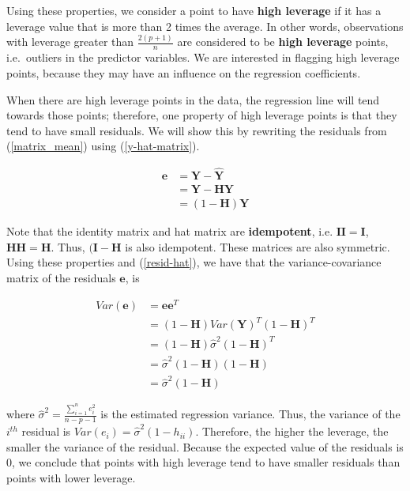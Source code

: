 \documentclass[]{book}
\begin{document}
Using these properties, we consider a point to have \textbf{high
leverage} if it has a leverage value that is more than 2 times the
average. In other words, observations with leverage greater than
\(\frac{2(p+1)}{n}\) are considered to be \textbf{high leverage} points,
i.e.~outliers in the predictor variables. We are interested in flagging
high leverage points, because they may have an influence on the
regression coefficients.

When there are high leverage points in the data, the regression line
will tend towards those points; therefore, one property of high leverage
points is that they tend to have small residuals. We will show this by
rewriting the residuals from (\ref{matrix_mean}) using
(\ref{y-hat-matrix}).

\begin{equation}
\label{resid-hat}
\begin{aligned}
\mathbf{e} &= \mathbf{Y} - \hat{\mathbf{Y}} \\[10pt]
& = \mathbf{Y} - \mathbf{H}\mathbf{Y} \\[10pt]
&= (1-\mathbf{H})\mathbf{Y}
\end{aligned}
\end{equation}

Note that the identity matrix and hat matrix are \textbf{idempotent},
i.e. \(\mathbf{I}\mathbf{I} = \mathbf{I}\),
\(\mathbf{H}\mathbf{H} = \mathbf{H}\). Thus,
\((\mathbf{I} - \mathbf{H}\) is also idempotent. These matrices are also
symmetric. Using these properties and (\ref{resid-hat}), we have that
the variance-covariance matrix of the residuals \(\boldsymbol{e}\), is

\begin{equation}
\label{resid-var}
\begin{aligned}
Var(\mathbf{e}) &= \mathbf{e}\mathbf{e}^T \\[10pt]
&=  (1-\mathbf{H})Var(\mathbf{Y})^T(1-\mathbf{H})^T \\[10pt]
&= (1-\mathbf{H})\hat{\sigma}^2(1-\mathbf{H})^T  \\[10pt]
&= \hat{\sigma}^2(1-\mathbf{H})(1-\mathbf{H})  \\[10pt]
&= \hat{\sigma}^2(1-\mathbf{H})
\end{aligned}
\end{equation}

where \(\hat{\sigma}^2 = \frac{\sum_{i=1}^{n}e_i^2}{n-p-1}\) is the
estimated regression variance. Thus, the variance of the \(i^{th}\)
residual is \(Var(e_i) = \hat{\sigma}^2(1-h_{ii})\). Therefore, the
higher the leverage, the smaller the variance of the residual. Because
the expected value of the residuals is 0, we conclude that points with
high leverage tend to have smaller residuals than points with lower
leverage.
\end{document}
